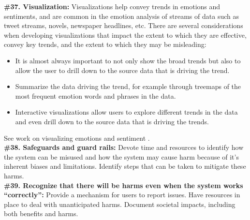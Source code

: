 \documentclass{clv3}
\begin{document}
\noindent \textbf{\#37. Visualization:} Visualizations help convey trends in emotions and sentiments, and are common in the emotion analysis of streams of data such as tweet streams, novels, newspaper headlines, etc. There are several considerations when developing visualizations that impact the extent to which they are effective, convey key trends, and the extent to which they may be misleading:\\[-20pt]
\begin{itemize}
    \item It is almost always important to not only show the broad trends but also to allow the user to drill down to the source data that is driving the trend.
    \vspace*{-1mm}
    \item Summarize the data driving the trend, for example through treemaps of the most frequent emotion words and phrases in the data.
    \vspace*{-1mm}
    \item Interactive visualizations allow users to explore different trends in the data and even drill down to the source data that is driving the trends.
\end{itemize}
\vspace*{-3mm}
\noindent See work on visualizing emotions and sentiment 
\cite{mohammad-2011-upon,dwibhasi2015analyzing,kucher2018visual,fraser-etal-2019-feel,gallagher2021generalized}.\\

\noindent \textbf{\#38. Safeguards and guard rails:} Devote time and resources to identify how the system can be misused and how the system may cause harm because of it’s inherent biases and limitations. Identify steps that can be taken to mitigate these harms.\\

\noindent \textbf{\#39. Recognize that there will be harms even when the system works ``correctly”:} Provide a mechanism for users to report issues. Have resources in place to deal with unanticipated harms. Document societal impacts, including both benefits and harms.\\
\end{document}
